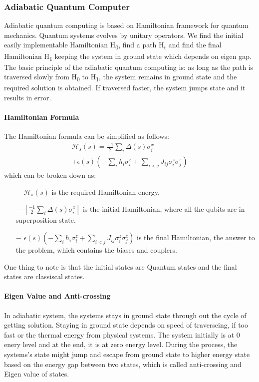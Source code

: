 \documentclass[12pt,conference]{IEEEtran}
\begin{document}
\subsubsection{Adiabatic Quantum Computer}
Adiabatic quantum computing is based on Hamiltonian framework for quantum mechanics. Quantum systems evolves by unitary operators. We find the initial easily implementable Hamiltonian H\textsubscript{0}, find a path H\textsubscript{t} and find the final Hamiltonian H\textsubscript{1} keeping the system in ground state which depends on eigen gap. The basic principle of the adiabatic quantum computing is: as long as the path is traversed slowly from H\textsubscript{0} to H\textsubscript{1}, the system remains in ground state and the required solution is obtained. If traversed faster, the system jumps state and it results in error.

\paragraph{Hamiltonian Formula} 
The Hamiltonian formula can be simplified as follows:
\begin{multline*}
  \mathcal{H}_s(s) = \frac{-1}{2} \sum_i \Delta (s) \sigma_i^x  \\ + \epsilon(s) ( - \sum_i h_i \sigma_i^z + \sum_{i<j} J_{ij}  \sigma_i^z \sigma_j^z)
\end{multline*}
which can be broken down as:
\begin{itemize}
  \item[$-$] $\mathcal{H}_s(s)$ is the required Hamiltonian energy.
  \item[$-$] $[\frac{-1}{2} \sum_i \Delta (s) \sigma_i^x]$ is the initial Hamiltonian, where all the qubits are in superposition state.
  \item[$-$] $ \epsilon(s) ( - \sum_i h_i \sigma_i^z + \sum_{i<j} J_{ij}  \sigma_i^z \sigma_j^z)$ is the final Hamiltonian, the answer to the problem, which contains the biases and couplers.
\end{itemize} 
One thing to note is that the initial states are Quantum states and the final states are classiscal states.

\paragraph{Eigen Value and Anti-crossing}
In adiabatic system, the systems stays in ground state through out the cycle of getting solution. Staying in ground state depends on speed of traverseing, if too fast or the thermal energy from physical systems. The system initially is at 0 enery level and at the end, it is at zero energy level. During the process, the systems's state might jump and escape from ground state to higher energy state based on the energy gap between two states, which is called anti-crossing and Eigen value of states.
\end{document}

